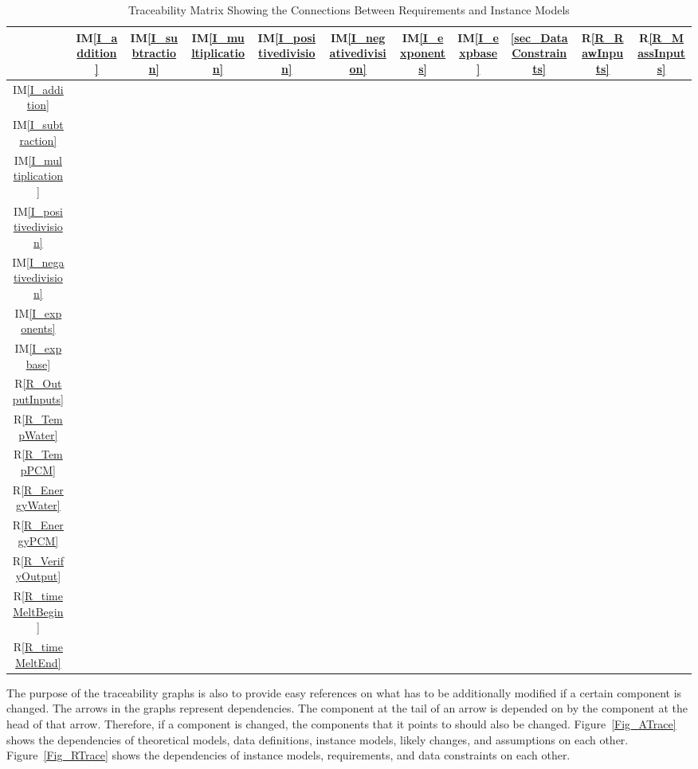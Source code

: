 \documentclass[12pt]{article}
\newcommand{\iref}[1]{IM\ref{#1}}
\newcommand{\rref}[1]{R\ref{#1}}
\begin{document}
\begin{table}[H]
	\centering
	\begin{tabular}{|c|c|c|c|c|c|c|c|c|c|c|}
		\hline
		& \iref{I_addition}& \iref{I_subtraction}& \iref{I_multiplication}& 
		\iref{I_positivedivision}& \iref{I_negativedivision}& 
		\iref{I_exponents}& 
		\iref{I_expbase}& \ref{sec_DataConstraints}& \rref{R_RawInputs}& 
		\rref{R_MassInputs} \\
		\hline
		\iref{I_addition}            & & & & & & & &&& \\ \hline
		\iref{I_subtraction}            & & & & & & &  &&&\\ \hline
		\iref{I_multiplication}          & & & & & & &  &&&\\ \hline
		\iref{I_positivedivision}          & & & & & & & &&& \\ \hline
		\iref{I_negativedivision}     & & & & & & & &&&\\ \hline
		\iref{I_exponents}    & & & & & & & &&&\\ \hline
		\iref{I_expbase}   & & & & & & & &&&\\ \hline
		\rref{R_OutputInputs}  & & & & & & &  &&&\\ \hline
		\rref{R_TempWater}     & & & & & & & &&&\\ \hline 
		\rref{R_TempPCM}       & & & & & & & &&&\\ \hline
		\rref{R_EnergyWater}   & & & & & & & &&&\\ \hline
		\rref{R_EnergyPCM}     & & & & & & & &&&\\ \hline
		\rref{R_VerifyOutput}  & & & & & & & &&&\\ \hline
		\rref{R_timeMeltBegin} & & & & & & & &&&\\ \hline
		\rref{R_timeMeltEnd}   & & & & & & & &&&\\ 
		\hline
	\end{tabular}
	\caption{Traceability Matrix Showing the Connections Between Requirements 
	and Instance Models}
	\label{Table:R_trace}
\end{table}

The purpose of the traceability graphs is also to provide easy references on
what has to be additionally modified if a certain component is changed.  The
arrows in the graphs represent dependencies. The component at the tail of an
arrow is depended on by the component at the head of that arrow. Therefore, if a
component is changed, the components that it points to should also be
changed. Figure~\ref{Fig_ATrace} shows the dependencies of theoretical models, 
data definitions, instance models, likely changes, and
assumptions on each other. Figure~\ref{Fig_RTrace} shows the dependencies of
instance models, requirements, and data constraints on each other.
\end{document}
